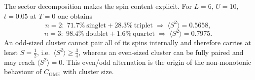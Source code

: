 The sector decomposition makes the spin content explicit. For $L=6$,
$U=10$, $t=0.05$ at $T=0$ one obtains
%
\begin{equation}
    n=2:\; 71.7\%\ \text{singlet} + 28.3\%\ \text{triplet}
    \;\Rightarrow\; \langle S^{2}\rangle = 0.5658,
\end{equation}
\begin{equation}
    n=3:\; 98.4\%\ \text{doublet} + 1.6\%\ \text{quartet}
    \;\Rightarrow\; \langle S^{2}\rangle = 0.7975 .
\end{equation}
%
An odd-sized cluster cannot pair all of its spins internally and therefore
carries at least $S=\tfrac12$, i.e.\ $\langle S^{2}\rangle\ge\tfrac34$, whereas
an even-sized cluster can be fully paired and may reach
$\langle S^{2}\rangle=0$. This even/odd alternation is the origin of the
non-monotonic behaviour of $C_{\mathrm{GME}}$ with cluster size.
